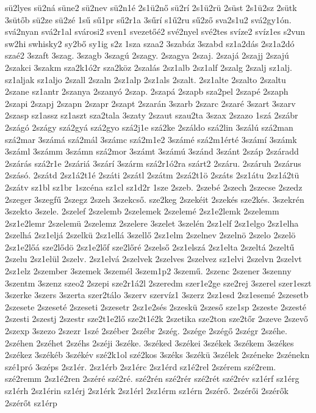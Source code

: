 {sü2lyes
sü2ná
süne2
sü2nev
sü2n1é
2s1ü2nő
sü2rí
2s1ü2rü
2süst
2s1ü2sz
2sütk
3sütőb
sü2ze
sü2zé
1sű
sű1pr
sű2r1a
3sűrí
s1ű2ru
sű2ző
sva2s1u2
svá2gy1ón.
svá2nyan
svá2r1al
svárosi2
sven1
svezetőé2
své2nyel
své2tes
svíze2
svíz1es
s2vun
sw2hi
swhisky2
sy2bő
sy1ig
s2z
1sza
szaa2
3szabáz
3szabd
sz1a2dás
2sz1a2dó
szaé2
3szaft
3szag.
3szagb
3szagú
2szagy.
2szagya
2szaj.
2szajá
2szajj
2szajú
2szakci
3szakm
sza2k1ó2r
sza2köz
2szalás
2sz1alb
2sz1alf
2szalg
2szalj
sz1alj.
sz1aljak
sz1aljo
2szall
2szaln
2sz1alp
2sz1als
2szalt.
2sz1alte
2szalto
2szaltu
2szane
sz1antr
2szanya
2szanyó
2szap.
2szapá
2szapb
sza2pel
2szapé
2szaph
2szapi
2szapj
2szapn
2szapr
2szapt
2szarán
3szarb
2szarc
2szaré
3szart
3szarv
2szasp
sz1assz
sz1aszt
sza2tala
3szaty
2szaut
szau2ta
3szax
2szazo
1szá
2szábr
2szágó
2szágy
szá2gyá
szá2gyo
szá2j1e
szá2ke
2száldo
szá2lin
3szálú
szá2man
szá2mar
3számá
szá2mál
3számc
szá2m1e2
3számé
szá2m1érté
3számí
3számk
3száml
3számm
3számn
szá2mor
3számt
3számú
3szánd
3szánt
2száp
2száradd
2szárás
szá2r1e
2száriá
3szárí
3szárm
szá2r1ó2ra
szárt2
2száru.
2száruh
2szárus
2szásó.
2szátd
2sz1á2t1é
2száti
2szátl
2szátm
2szá2t1ö
2száts
2sz1átu
2sz1á2tü
2szátv
sz1bl
sz1br
1szcéna
sz1cl
sz1d2r
1sze
2szeb.
2szebé
2szech
2szecse
2szedz
2szeger
3szegfű
2szegz
2szeh
3szekcső.
sze2keg
2szekéit
2szekés
sze2kés.
3szekrén
3szekto
3szele.
2szelef
2szelemb
2szelemek
2szelemé
2sz1e2lemk
2szelemm
2sz1e2lemr
2szelemü
2szelemz
2szelere
3szelet
3szelén
2sz1elf
2sz1elgo
2sz1elha
2szelhá
2sz1eljá
2szelkü
2sz1ellá
3szellő
2sz1elm
2szelnev
2szelnö
2szelo
2szelö
2sz1e2lőá
sze2lődö
2sz1e2lőf
sze2lőré
2szelső
2sz1elszá
2sz1elta
2szeltá
2szeltű
2szelu
2sz1elül
2szelv.
2sz1elvá
2szelvek
2szelves
2szelvez
sz1elvi
2szelvn
2szelvt
2sz1elz
2szember
3szemek
3személ
3szem1p2
3szemű.
2szenc
2szener
3szenny
3szentm
3szenz
szeo2
2szepi
sze2r1á2l
2szeredm
szer1e2ge
sze2rej
3szerel
szer1eszt
3szerke
3szers
3szerta
szer2tálo
3szerv
szervíz1
3szerz
2sz1esd
2sz1esemé
2szesetb
2szesete
2szeseté
2szeseti
2szesetr
2sz1e2sés
2szeskü
2szeső
sze1sp
2szeste
2szesté
2szesti
2szestj
2szestr
sze2t1e2lő
sze2t1é2k
2szetika
sze2ton
sze2tőr
2szeve
2szevő
2szexp
3szezo
2szezr
1szé
2széber
2szébr
2szég.
2szége
2szégő
2szégr
2széhe.
2széhen
2széhet
2széhs
2széji
3széke.
3széked
3székei
3székek
3székem
3székes
2székez
3székéb
3székév
szé2k1ol
szé2kos
3széks
3székü
3szélek
2széneke
2szénekn
szé1pró
3széps
2sz1ér.
2sz1érb
2sz1érc
2sz1érd
sz1é2rel
2szérem
szé2rem.
szé2remm
2sz1é2ren
2széré
szé2ré.
szé2rén
szé2rér
szé2rét
szé2rév
sz1érf
sz1érg
sz1érh
2sz1érin
sz1érj
2sz1érk
2sz1érl
2sz1érm
sz1érn
2szérő.
2szérői
2szérők
2szérőt
sz1érp
}
